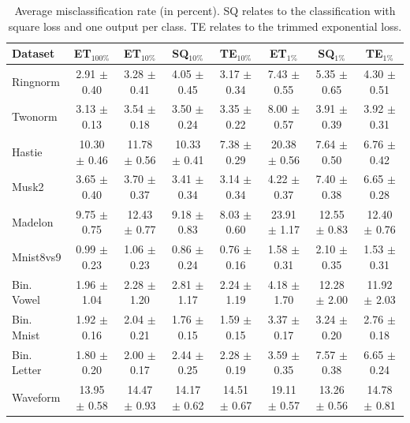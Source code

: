 \documentclass{article}
\newcommand{\bestA}{\cellcolor{orange}}
\newcommand{\bestB}{\cellcolor{dodgerblue}}
\begin{document}
\begin{table}[t]
\caption{Average misclassification rate (in percent). SQ relates to the 
classification with square loss and one output per class. TE relates to the 
trimmed exponential loss.}
\label{tab:cls}
\vskip 0.15in
\begin{center}
\begin{small}
\begin{sc}
\begin{tabular}{l|c|ccc|ccc}
\hline
Dataset & ET$_{100\%}$ & ET$_{10\%}$ & SQ$_{10\%}$ & TE$_{10\%}$ & ET$_{1\%}$ & 
SQ$_{1\%}$ & TE$_{1\%}$\\
\hline 
Ringnorm &  2.91 $\pm$ 0.40 & 3.28 $\pm$ 0.41 & 4.05 $\pm$ 0.45 & \bestA 3.17 
$\pm$ 0.34 & 7.43 $\pm$ 0.55 & 5.35 $\pm$ 0.65 & \bestB 4.30 $\pm$ 0.51 \\
Twonorm & 3.13 $\pm$ 0.13 & 3.54 $\pm$ 0.18 & 3.50 $\pm$ 0.24 & \bestA 3.35 
$\pm$ 0.22 & 8.00 $\pm$ 0.57 & \bestB 3.91 $\pm$ 0.39 & 3.92 $\pm$ 0.31 \\
Hastie & 10.30 $\pm$ 0.46 & 11.78 $\pm$ 0.56 & 10.33 $\pm$ 0.41 & \bestA 7.38 
$\pm$ 0.29 & 20.38 $\pm$ 0.56 & 7.64 $\pm$ 0.50 & \bestB 6.76 $\pm$ 0.42 \\
Musk2 & 3.65 $\pm$ 0.40 & 3.70 $\pm$ 0.37 & 3.41 $\pm$ 0.34 & \bestA 3.14 $\pm$ 
0.34 & 4.22 $\pm$ 0.37 & 7.40 $\pm$ 0.38 & \bestB 6.65 $\pm$ 0.28 \\
Madelon & 9.75 $\pm$ 0.75 & 12.43 $\pm$ 0.77 & 9.18 $\pm$ 0.83 & \bestA 8.03 
$\pm$ 0.60 & 23.91 $\pm$ 1.17 & 12.55 $\pm$ 0.83 & \bestB 12.40 $\pm$ 0.76 \\
Mnist8vs9 & 0.99 $\pm$ 0.23 & 1.06 $\pm$ 0.23 & 0.86 $\pm$ 0.24 & \bestA 0.76 
$\pm$ 0.16 & 1.58 $\pm$ 0.31 & 2.10 $\pm$ 0.35 & \bestB 1.53 $\pm$ 0.31 \\
\hline
Bin. Vowel & 1.96 $\pm$ 1.04 & 2.28 $\pm$ 1.20 & 2.81 $\pm$ 1.17 & \bestA 2.24 
$\pm$ 1.19 & \bestB 4.18 $\pm$ 1.70 & 12.28 $\pm$ 2.00 & 11.92 $\pm$ 2.03 \\
Bin. Mnist & 1.92 $\pm$ 0.16 & 2.04 $\pm$ 0.21 & 1.76 $\pm$ 0.15 & \bestA 1.59 
$\pm$ 0.15 & 3.37 $\pm$ 0.17 & 3.24 $\pm$ 0.20 & \bestB 2.76 $\pm$ 0.18 \\
Bin. Letter & 1.80 $\pm$ 0.20 & \bestA 2.00 $\pm$ 0.17 & 2.44 $\pm$ 0.25 & 
2.28 $\pm$ 0.19 & \bestB 3.59 $\pm$ 0.35 & 7.57 $\pm$ 0.38 & 6.65 $\pm$ 0.24 \\
\hline
Waveform & 13.95 $\pm$ 0.58 & 14.47 $\pm$ 0.93 & \bestA 14.17 $\pm$ 0.62 & 
14.51 $\pm$ 0.67 & 19.11 $\pm$ 0.57 & \bestB 13.26 $\pm$ 0.56 & 14.78 $\pm$ 
0.81 \\

\end{tabular}
\end{sc}
\end{small}
\end{center}
\end{table}
\end{document}
